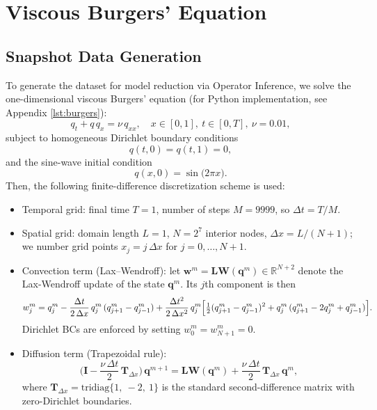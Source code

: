 
\section{Viscous Burgers' Equation}
\label{sec:burgers}


\subsection*{Snapshot Data Generation}

To generate the dataset for model reduction via Operator Inference, we solve the one-dimensional viscous Burgers’ equation (for Python implementation, see Appendix \ref{lst:burgers}):\\
$$q_t + q\,q_x = \nu\,q_{xx}, \quad x\in[0,1],~t\in[0,T],~\nu=0.01,$$
subject to homogeneous Dirichlet boundary conditions\\
$$q(t,0) = q(t,1) = 0,$$
and the sine-wave initial condition\\
$$q(x,0) = \sin\bigl(2\pi x\bigr).$$
Then, the following finite-difference discretization scheme is used:
\begin{itemize}
  \item Temporal grid: final time $T=1$, number of steps $M=9999$, so $\Delta t = T/M$.
  \item Spatial grid: domain length $L=1$, $N=2^7$ interior nodes, $\Delta x = L/(N+1)$; we number grid points $x_j = j\,\Delta x$ for $j=0,\ldots,N+1$.
  \item Convection term (Lax–Wendroff): let $\mathbf{w}^m = \mathbf{LW}(\mathbf{q}^m) \in \mathbb{R}^{N+2}$ denote the Lax-Wendroff update of the state $\mathbf{q}^m$. Its $j$th component is then\\
    $$w_j^m = q_j^m
      - \frac{\Delta t}{2\,\Delta x}\,q_j^m\,(q_{j+1}^m - q_{j-1}^m)
      + \frac{\Delta t^2}{2\,\Delta x^2}\,q_j^m
        \Bigl[\tfrac12(q_{j+1}^m - q_{j-1}^m)^2
               + q_j^m\,(q_{j+1}^m - 2q_j^m + q_{j-1}^m)\Bigr].$$
    Dirichlet BCs are enforced by setting $w_0^m = w_{N+1}^m = 0$.
  \item Diffusion term (Trapezoidal rule):\\
    $$\Biggl(\mathbf{I} - \dfrac{\nu\,\Delta t}{2}\,\mathbf{T}_{\Delta x}\Biggr)\,\mathbf{q}^{m+1}
      = \mathbf{LW}(\mathbf{q}^m) + \dfrac{\nu\,\Delta t}{2}\,\mathbf{T}_{\Delta x}\,\mathbf{q}^m,$$
    where $\mathbf{T}_{\Delta x}=\text{tridiag}\{1,~-2,~1\}$ is the standard second-difference matrix with zero-Dirichlet boundaries.
\end{itemize}
 
